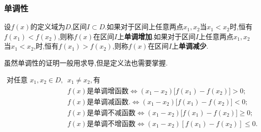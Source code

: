 \documentclass[12pt, a4paper, oneside, UTF8]{ctexbook}  %
\begin{document}
\subsubsection{单调性}
\begin{defn}{}{}
    设$f(x)$的定义域为$D$,区间$I \subset D$.如果对于区间上任意两点$x_1,x_2$当$x_1 < x_2$时,恒有$f(x_1) < f(x_2)$,则称$f(x)$在区间$I$上\textbf{单调增加}.如果对于区间$I$上任意两点$x_1,x_2$当$x_1<x_2$,时,恒有$f(x_1)>f(x_2)$,则称$f(x)$在区间$I$上\textbf{单调减少}.
\end{defn}
虽然单调性的证明一般用求导,但是定义法也需要掌握.

$$
    \begin{aligned}
        \text{对任意 }x_1,x_2\in D, & x_1\neq x_2,\text{有}                  \\
                                 & f(x)\text{是单调增函数}
        \Leftrightarrow(x_{1}-x_{2})\Big[f(x_{1})-f(x_{2})\Big]{>}0;     \\
                                 & f(x)\text{是单调减函数}.
        \Leftrightarrow(x_{1}-x_{2})\Big[f(x_{1})-f(x_{2})\Big]<0;       \\
                                 & f(x)\text{是单调不减函数}
        \Leftrightarrow(x_1-x_2){\big[}f(x_1)-f(x_2){\big]}{\geqslant}0; \\
                                 & f(x)\text{是单调不增函数}
        \Leftrightarrow(x_1-x_2){\left[f(x_1)-f(x_2)\right]}\leqslant0.
    \end{aligned}
$$
\end{document}
